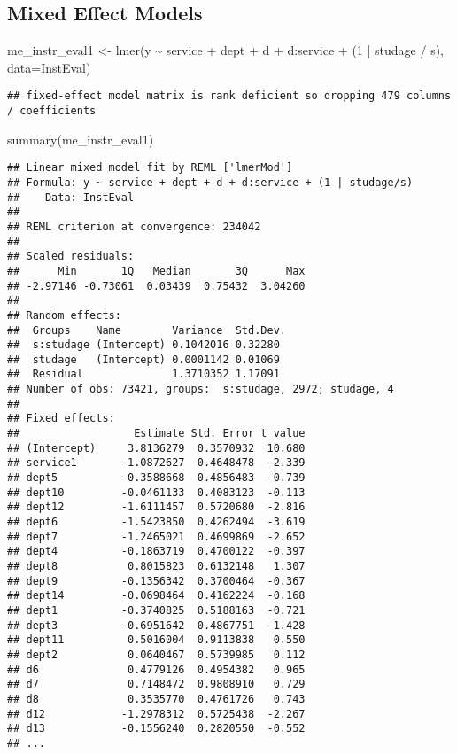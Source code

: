 \documentclass[
]{article}
\newenvironment{Shaded}{\begin{snugshade}}{\end{snugshade}}
\newcommand{\AttributeTok}[1]{\textcolor[rgb]{0.77,0.63,0.00}{#1}}
\newcommand{\DecValTok}[1]{\textcolor[rgb]{0.00,0.00,0.81}{#1}}
\newcommand{\FunctionTok}[1]{\textcolor[rgb]{0.00,0.00,0.00}{#1}}
\newcommand{\NormalTok}[1]{#1}
\newcommand{\OtherTok}[1]{\textcolor[rgb]{0.56,0.35,0.01}{#1}}
\newcommand{\SpecialCharTok}[1]{\textcolor[rgb]{0.00,0.00,0.00}{#1}}
\begin{document}
\hypertarget{mixed-effect-models}{%
\subsection{Mixed Effect Models}\label{mixed-effect-models}}

\begin{Shaded}
\begin{Highlighting}[]
\NormalTok{me\_instr\_eval1 }\OtherTok{\textless{}{-}} \FunctionTok{lmer}\NormalTok{(y }\SpecialCharTok{\textasciitilde{}}\NormalTok{ service }\SpecialCharTok{+}\NormalTok{ dept }\SpecialCharTok{+}\NormalTok{ d }\SpecialCharTok{+}\NormalTok{ d}\SpecialCharTok{:}\NormalTok{service }\SpecialCharTok{+}\NormalTok{ (}\DecValTok{1} \SpecialCharTok{|}\NormalTok{ studage }\SpecialCharTok{/}\NormalTok{ s), }\AttributeTok{data=}\NormalTok{InstEval)}
\end{Highlighting}
\end{Shaded}

\begin{verbatim}
## fixed-effect model matrix is rank deficient so dropping 479 columns / coefficients
\end{verbatim}

\begin{Shaded}
\begin{Highlighting}[]
\FunctionTok{summary}\NormalTok{(me\_instr\_eval1)}
\end{Highlighting}
\end{Shaded}

\begin{verbatim}
## Linear mixed model fit by REML ['lmerMod']
## Formula: y ~ service + dept + d + d:service + (1 | studage/s)
##    Data: InstEval
## 
## REML criterion at convergence: 234042
## 
## Scaled residuals: 
##      Min       1Q   Median       3Q      Max 
## -2.97146 -0.73061  0.03439  0.75432  3.04260 
## 
## Random effects:
##  Groups    Name        Variance  Std.Dev.
##  s:studage (Intercept) 0.1042016 0.32280 
##  studage   (Intercept) 0.0001142 0.01069 
##  Residual              1.3710352 1.17091 
## Number of obs: 73421, groups:  s:studage, 2972; studage, 4
## 
## Fixed effects:
##                  Estimate Std. Error t value
## (Intercept)     3.8136279  0.3570932  10.680
## service1       -1.0872627  0.4648478  -2.339
## dept5          -0.3588668  0.4856483  -0.739
## dept10         -0.0461133  0.4083123  -0.113
## dept12         -1.6111457  0.5720680  -2.816
## dept6          -1.5423850  0.4262494  -3.619
## dept7          -1.2465021  0.4699869  -2.652
## dept4          -0.1863719  0.4700122  -0.397
## dept8           0.8015823  0.6132148   1.307
## dept9          -0.1356342  0.3700464  -0.367
## dept14         -0.0698464  0.4162224  -0.168
## dept1          -0.3740825  0.5188163  -0.721
## dept3          -0.6951642  0.4867751  -1.428
## dept11          0.5016004  0.9113838   0.550
## dept2           0.0640467  0.5739985   0.112
## d6              0.4779126  0.4954382   0.965
## d7              0.7148472  0.9808910   0.729
## d8              0.3535770  0.4761726   0.743
## d12            -1.2978312  0.5725438  -2.267
## d13            -0.1556240  0.2820550  -0.552
## ...
\end{verbatim}
\end{document}
